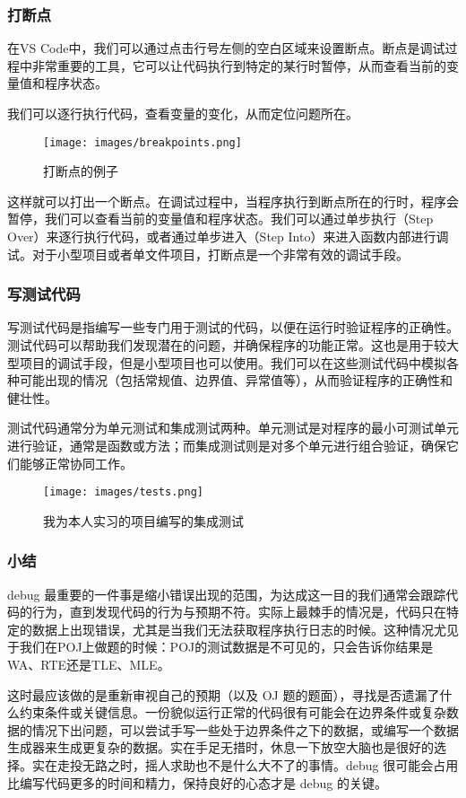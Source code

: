 \documentclass[../main.tex]{subfiles}
\begin{document}
\subsubsection{打断点}

在VS Code中，我们可以通过点击行号左侧的空白区域来设置断点。断点是调试过程中非常重要的工具，它可以让代码执行到特定的某行时暂停，从而查看当前的变量值和程序状态。

我们可以逐行执行代码，查看变量的变化，从而定位问题所在。

\begin{figure}[htbp]
\centering
\texttt{[image: images/breakpoints.png]}
\caption{打断点的例子}
\end{figure}

这样就可以打出一个断点。在调试过程中，当程序执行到断点所在的行时，程序会暂停，我们可以查看当前的变量值和程序状态。我们可以通过单步执行（Step Over）来逐行执行代码，或者通过单步进入（Step Into）来进入函数内部进行调试。对于小型项目或者单文件项目，打断点是一个非常有效的调试手段。

\subsubsection{写测试代码}

写测试代码是指编写一些专门用于测试的代码，以便在运行时验证程序的正确性。测试代码可以帮助我们发现潜在的问题，并确保程序的功能正常。这也是用于较大型项目的调试手段，但是小型项目也可以使用。我们可以在这些测试代码中模拟各种可能出现的情况（包括常规值、边界值、异常值等），从而验证程序的正确性和健壮性。

测试代码通常分为单元测试和集成测试两种。单元测试是对程序的最小可测试单元进行验证，通常是函数或方法；而集成测试则是对多个单元进行组合验证，确保它们能够正常协同工作。

\begin{figure}[htbp]
\centering
\texttt{[image: images/tests.png]}
\caption{我为本人实习的项目编写的集成测试}
\end{figure}

\subsubsection{小结}

debug 最重要的一件事是缩小错误出现的范围，为达成这一目的我们通常会跟踪代码的行为，直到发现代码的行为与预期不符。实际上最棘手的情况是，代码只在特定的数据上出现错误，尤其是当我们无法获取程序执行日志的时候。这种情况尤见于我们在POJ上做题的时候：POJ的测试数据是不可见的，只会告诉你结果是WA、RTE还是TLE、MLE。

这时最应该做的是重新审视自己的预期（以及 OJ 题的题面），寻找是否遗漏了什么约束条件或关键信息。一份貌似运行正常的代码很有可能会在边界条件或复杂数据的情况下出问题，可以尝试手写一些处于边界条件之下的数据，或编写一个数据生成器来生成更复杂的数据。实在手足无措时，休息一下放空大脑也是很好的选择。实在走投无路之时，摇人求助也不是什么大不了的事情。debug 很可能会占用比编写代码更多的时间和精力，保持良好的心态才是 debug 的关键。
\end{document}
